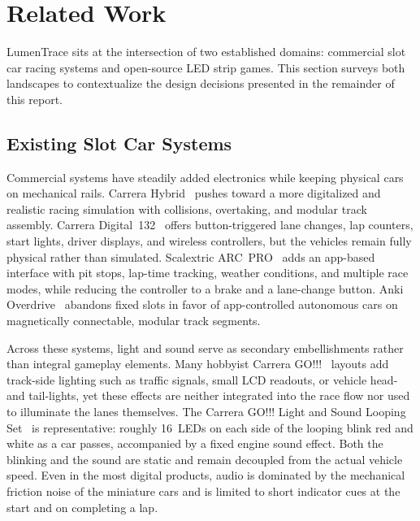 \documentclass[10pt,journal,final,a4paper]{IEEEtran}
\begin{document}
\section{Related Work}
\label{sec:related-work}

LumenTrace sits at the intersection of two established domains: commercial slot car racing systems and open-source LED strip games. This section surveys both landscapes to contextualize the design decisions presented in the remainder of this report.

\subsection{Existing Slot Car Systems}
\label{subsec:existing-slot-car-systems}

Commercial systems have steadily added electronics while keeping physical cars on mechanical rails. Carrera Hybrid~\cite{carrera:2026hybrid} pushes toward a more digitalized and realistic racing simulation with collisions, overtaking, and modular track assembly. Carrera Digital~132~\cite{carrera:2026digital} offers button-triggered lane changes, lap counters, start lights, driver displays, and wireless controllers, but the vehicles remain fully physical rather than simulated. Scalextric ARC~PRO~\cite{scalextric:2026arc} adds an app-based interface with pit stops, lap-time tracking, weather conditions, and multiple race modes, while reducing the controller to a brake and a lane-change button. Anki Overdrive~\cite{anki:2026overdrive} abandons fixed slots in favor of app-controlled autonomous cars on magnetically connectable, modular track segments.

Across these systems, light and sound serve as secondary embellishments rather than integral gameplay elements. Many hobbyist Carrera GO!!!~\cite{carrera:2026carrera} layouts add track-side lighting such as traffic signals, small LCD readouts, or vehicle head- and tail-lights, yet these effects are neither integrated into the race flow nor used to illuminate the lanes themselves. The Carrera GO!!! Light and Sound Looping Set~\cite{carrera:2026light} is representative: roughly 16~LEDs on each side of the looping blink red and white as a car passes, accompanied by a fixed engine sound effect. Both the blinking and the sound are static and remain decoupled from the actual vehicle speed. Even in the most digital products, audio is dominated by the mechanical friction noise of the miniature cars and is limited to short indicator cues at the start and on completing a lap.
\end{document}
